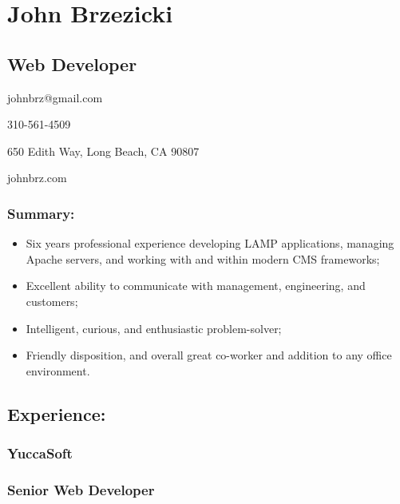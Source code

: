 \hypertarget{john-brzezicki}{%
\section{John Brzezicki}\label{john-brzezicki}}

\hypertarget{web-developer}{%
\subsection{Web Developer}\label{web-developer}}

johnbrz@gmail.com

310-561-4509

650 Edith Way, Long Beach, CA 90807

johnbrz.com

\hypertarget{summary}{%
\subsubsection{Summary:}\label{summary}}

\begin{itemize}
\tightlist
\item
  Six years professional experience developing LAMP applications,
  managing Apache servers, and working with and within modern CMS
  frameworks;
\item
  Excellent ability to communicate with management, engineering, and
  customers;
\item
  Intelligent, curious, and enthusiastic problem-solver;
\item
  Friendly disposition, and overall great co-worker and addition to any
  office environment.
\end{itemize}

\hypertarget{experience}{%
\subsection{Experience:}\label{experience}}

\hypertarget{yuccasoft}{%
\subsubsection{YuccaSoft}\label{yuccasoft}}

\hypertarget{senior-web-developer}{%
\subsubsection{Senior Web Developer}\label{senior-web-developer}}

